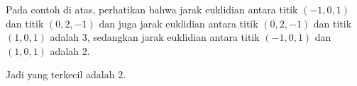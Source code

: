 Pada contoh di atas, perhatikan bahwa jarak euklidian antara titik $(-1,0,1)$ dan titik $(0,2,-1)$ dan juga jarak euklidian antara titik $(0,2,-1)$ dan titik $(1,0,1)$ adalah $3$, sedangkan jarak euklidian antara titik $(-1,0,1)$ dan $(1,0,1)$ adalah $2$.

Jadi yang terkecil adalah $2$.